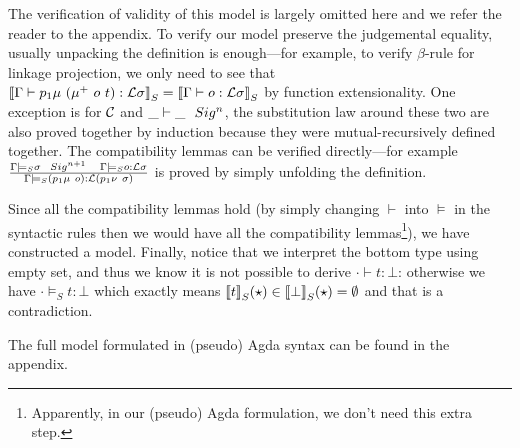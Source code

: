 The verification of validity of this model is largely omitted here and we refer the reader to the appendix. To verify our model preserve the judgemental equality, usually unpacking the definition is enough---for example, to verify $\beta$-rule for linkage projection, we only need to see that ${{\llbracket {{ {\Gamma} \vdash {p_1\mu~(\mu^+~o~t)} : {{\mathcal{L}}\sigma} }} \rrbracket}_S} = {{\llbracket {{ {\Gamma} \vdash {o} : {{\mathcal{L}}\sigma} }} \rrbracket}_S}$ by function extensionality. One exception is for ${\mathcal{C}}$ and ${ {\_} \vdash {\_} \ \ Sig^{n} }$, the substitution law around these two are also proved together by induction because they were mutual-recursively defined together. The compatibility lemmas can be verified directly---for example $\frac{{ {\Gamma} \models_S {\sigma} \ \ Sig^{n+1} }\quad{ {\Gamma} \models_S {o} : {{\mathcal{L}}\sigma} }}{{ {\Gamma} \models_S {(p_1\mu~o)} : {{\mathcal{L}}(p_1\nu~\sigma)} }}$ is proved by simply unfolding the definition.


Since all the compatibility lemmas hold (by simply changing $\vdash$ into $\models$ in the syntactic rules then we would have all the compatibility lemmas\footnote{Apparently, in our (pseudo) Agda formulation, we don't need this extra step.}), we have constructed a model.
Finally, notice that we interpret the bottom type using empty set, and thus we know it is not possible to derive $\cdot \vdash t : \bot$: otherwise we have $\cdot \models_S t : \bot$ which exactly means ${{\llbracket {t} \rrbracket}_S}(\star) \in {{\llbracket {\bot} \rrbracket}_S}(\star) = \emptyset$ 
and that is a contradiction.

The full model formulated in (pseudo) Agda syntax can be found in the appendix.

